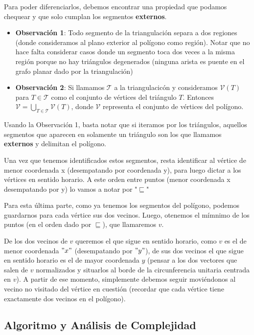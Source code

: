 Para poder diferenciarlos, debemos encontrar una propiedad que podamos chequear y que solo cumplan los segmentos \textbf{externos}.
\begin{itemize}
	\item \textbf{Observación 1}: Todo segmento de la triangulación separa a dos regiones (donde consideramos al plano exterior al polígono como región). Notar que no hace falta considerar casos donde un segmento toca dos veces a la misma región porque no hay triángulos degenerados (ninguna arista es puente en el grafo planar dado por la triangulación)
	\item \textbf{Observación 2}: Si llamamos $\mathcal{T}$ a la triangulacicón y consideramos $\mathcal{V}(T)$ para $T \in \mathcal{T}$ como el conjunto de vértices del triángulo $T$. Entonces $\mathcal{V} = \bigcup\limits_{T \in \mathcal{T}} \mathcal{V}(T)$, donde $\mathcal{V}$ representa el conjunto de vértices del polígono.
\end{itemize}

Usando la Observación 1, basta notar que si iteramos por los triángulos, aquellos segmentos que aparecen en solamente un triángulo son los que llamamos \textbf{externos} y delimitan el polígono.

Una vez que tenemos identificados estos segmentos, resta identificar al vértice de menor coordenada x (desempatando por coordenada y), para luego dictar a los vértices en sentido horario. A este orden entre puntos (menor coordenada x desempatando por y) lo vamos a notar por "$\sqsubseteq$"

Para esta última parte, como ya tenemos los segmentos del polígono, podemos guardarnos para cada vértice sus dos vecinos. Luego, otenemos el mímnimo de los puntos (en el orden dado por $\sqsubseteq$), que llamaremos $v$. 

De los dos vecinos de $v$ queremos el que sigue en sentido horario, como $v$ es el de menor coordenada $"x"$ (desempatando por $"y"$), de sus dos vecinos el que sigue en sentido horario es el de mayor coordenada $y$ (pensar a los dos vectores que salen de $v$ normalizados y situarlos al borde de la circunferencia unitaria centrada en $v$). A partir de ese momento, simplemente debemos seguir moviéndonos al vecino no visitado del vértice en cuestión (recordar que cada vértice tiene exactamente dos vecinos en el polígono).

\subsection{Algoritmo y Análisis de Complejidad}

